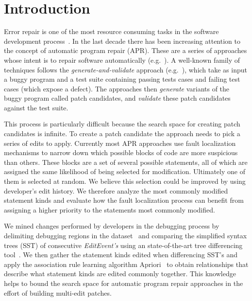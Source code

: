 \documentclass[sigconf]{acmart}
\begin{document}





\maketitle

\section{Introduction}
Error repair is one of the most resource consuming tasks in 
the software development process~\cite{Weiss07,Tassey02,Britton13}.
In the last decade there has been increasing attention to 
the concept of automatic program repair (APR). These are a 
series of approaches whose intent is to repair software
automatically (e.g.~\cite{legoues12,kim2013,Weimer13,long15SPR,long16proph,debroy10,perkins09,wei10}).
A well-known family of techniques follows the \emph{generate-and-validate}
approach (e.g.~\cite{legoues12,kim2013,Qi13TrpAutoR,xuan16}), 
which take as input a buggy program and a test suite containing
passing tests cases and failing test cases (which expose a defect).
The approaches then \emph{generate} variants of the buggy program
called patch candidates, and \emph{validate} these patch
candidates against the test suite.

This process is particularly difficult because the search space
for creating patch candidates is infinite. To create a patch 
candidate the approach needs to pick a series of edits to apply.
Currently most APR approaches use fault localization mechanisms to 
narrow down which possible blocks of code are
more suspicious than others.  
These blocks are 
a set of several possible statements, all of which are assigned
the same likelihood of being selected for modification.
Ultimately one of them is selected at random.
We believe this selection could be improved by using
developer's
edit history. We therefore analyze the most commonly 
modified statement kinds and evaluate how the 
fault localization process can benefit from assigning
a higher priority to the statements most commonly modified.

We mined changes performed by developers in the debugging
process by delimiting debugging regions in the 
dataset~\cite{msr18challenge} and comparing the simplified syntax
trees (SST) of consecutive \textit{EditEvent's} using an 
state-of-the-art tree differencing tool~\cite{Pawlik16Apted}.
We then gather the statement kinds edited when
differencing SST's and apply the association
rule learning algorithm Apriori~\cite{Agrawal94}
to obtain relationships that describe what statement kinds
are edited commonly together. This knowledge helps to 
bound the search space for automatic program repair approaches
in the effort of building multi-edit patches.
\end{document}
